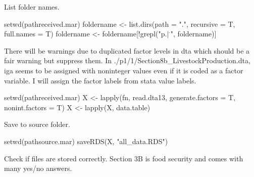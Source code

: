 List folder names.
\begin{Schunk}
\begin{Sinput}
setwd(pathreceived.mar)
foldername <- list.dirs(path = ".", recursive = T, full.names = T)
foldername <- foldername[!grepl("p.$|^.$", foldername)]
\end{Sinput}
\end{Schunk}
\begin{Schunk}
\end{Schunk}
There will be warnings due to duplicated factor levels in dta which should be a fair warning but suppress them. In \textsf{\footnotesize./p1/1/Section8b\_LivestockProduction.dta}, \textsf{iga} seems to be assigned with noninteger values even if it is coded as a factor variable. I will assign the factor labels from stata value labels.
\begin{Schunk}
\begin{Sinput}
setwd(pathreceived.mar)
X <- lapply(fn, read.dta13, generate.factors = T, nonint.factors = T)
X <- lapply(X, data.table)
\end{Sinput}
\end{Schunk}
Save to \textsf{source} folder.
\begin{Schunk}
\begin{Sinput}
setwd(pathsource.mar)
saveRDS(X, "all_data.RDS")
\end{Sinput}
\end{Schunk}
Check if files are stored correctly. Section 3B is food security and comes with many yes/no answers.
